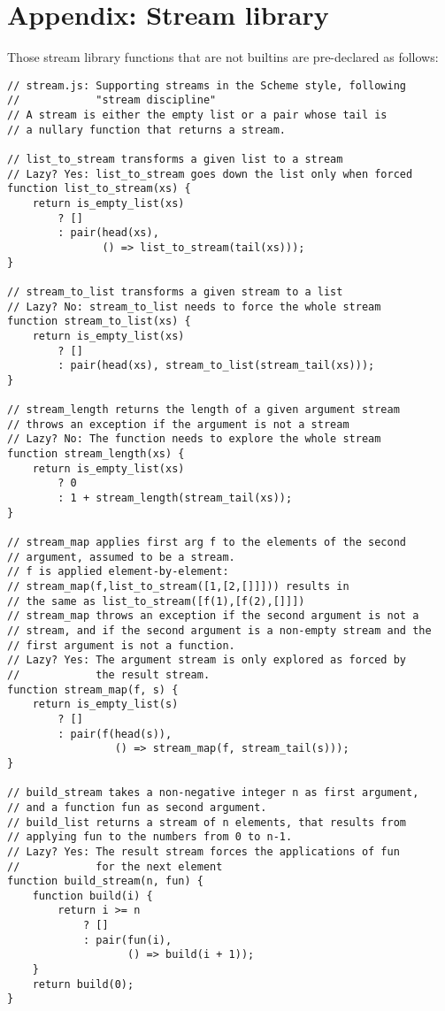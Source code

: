 \section*{Appendix: Stream library}

Those stream library functions that are not builtins are pre-declared as follows:

\begin{lstlisting}
// stream.js: Supporting streams in the Scheme style, following
//            "stream discipline"
// A stream is either the empty list or a pair whose tail is
// a nullary function that returns a stream.

// list_to_stream transforms a given list to a stream
// Lazy? Yes: list_to_stream goes down the list only when forced
function list_to_stream(xs) {
    return is_empty_list(xs)
        ? []
        : pair(head(xs), 
               () => list_to_stream(tail(xs))); 
}

// stream_to_list transforms a given stream to a list
// Lazy? No: stream_to_list needs to force the whole stream
function stream_to_list(xs) {
    return is_empty_list(xs)
        ? []
        : pair(head(xs), stream_to_list(stream_tail(xs)));
}

// stream_length returns the length of a given argument stream
// throws an exception if the argument is not a stream
// Lazy? No: The function needs to explore the whole stream
function stream_length(xs) {
    return is_empty_list(xs)
        ? 0
        : 1 + stream_length(stream_tail(xs));
}

// stream_map applies first arg f to the elements of the second
// argument, assumed to be a stream.
// f is applied element-by-element:
// stream_map(f,list_to_stream([1,[2,[]]])) results in
// the same as list_to_stream([f(1),[f(2),[]]])
// stream_map throws an exception if the second argument is not a
// stream, and if the second argument is a non-empty stream and the
// first argument is not a function.
// Lazy? Yes: The argument stream is only explored as forced by
//            the result stream.
function stream_map(f, s) {
    return is_empty_list(s)
        ? []
        : pair(f(head(s)), 
                 () => stream_map(f, stream_tail(s)));
}

// build_stream takes a non-negative integer n as first argument,
// and a function fun as second argument.
// build_list returns a stream of n elements, that results from
// applying fun to the numbers from 0 to n-1.
// Lazy? Yes: The result stream forces the applications of fun
//            for the next element
function build_stream(n, fun) {
    function build(i) {
        return i >= n
            ? []
            : pair(fun(i), 
                   () => build(i + 1)); 
    }
    return build(0);
}


\end{lstlisting}

